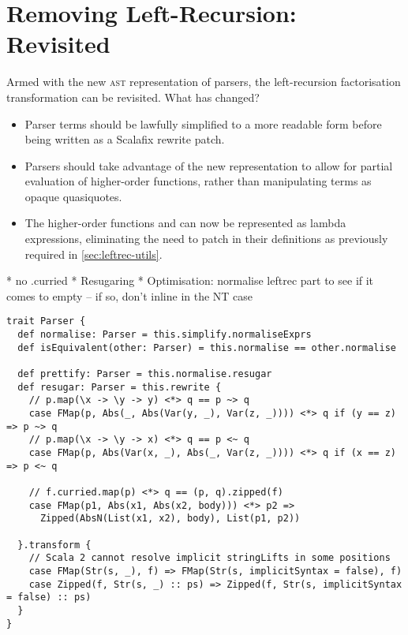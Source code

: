 \documentclass[../../main.tex]{subfiles}
\begin{document}

\section{Removing Left-Recursion: Revisited}
Armed with the new \textsc{ast} representation of parsers, the left-recursion factorisation transformation can be revisited.
What has changed?
\begin{itemize}
  \item Parser terms should be lawfully simplified to a more readable form before being written as a Scalafix rewrite patch.
  \item Parsers should take advantage of the new  representation to allow for partial evaluation of higher-order functions, rather than manipulating terms as opaque quasiquotes.
  \item The higher-order functions  and  can now be represented as  lambda expressions, eliminating the need to patch in their definitions as previously required in \cref{sec:leftrec-utils}.
\end{itemize}

* no .curried
* Resugaring
* Optimisation: normalise leftrec part to see if it comes to empty -- if so, don't inline in the NT case

\begin{verbatim}
trait Parser {
  def normalise: Parser = this.simplify.normaliseExprs
  def isEquivalent(other: Parser) = this.normalise == other.normalise

  def prettify: Parser = this.normalise.resugar
  def resugar: Parser = this.rewrite {
    // p.map(\x -> \y -> y) <*> q == p ~> q
    case FMap(p, Abs(_, Abs(Var(y, _), Var(z, _)))) <*> q if (y == z) => p ~> q
    // p.map(\x -> \y -> x) <*> q == p <~ q
    case FMap(p, Abs(Var(x, _), Abs(_, Var(z, _)))) <*> q if (x == z) => p <~ q

    // f.curried.map(p) <*> q == (p, q).zipped(f)
    case FMap(p1, Abs(x1, Abs(x2, body))) <*> p2 =>
      Zipped(AbsN(List(x1, x2), body), List(p1, p2))

  }.transform {
    // Scala 2 cannot resolve implicit stringLifts in some positions
    case FMap(Str(s, _), f) => FMap(Str(s, implicitSyntax = false), f)
    case Zipped(f, Str(s, _) :: ps) => Zipped(f, Str(s, implicitSyntax = false) :: ps)
  }
}
\end{verbatim}
\end{document}
